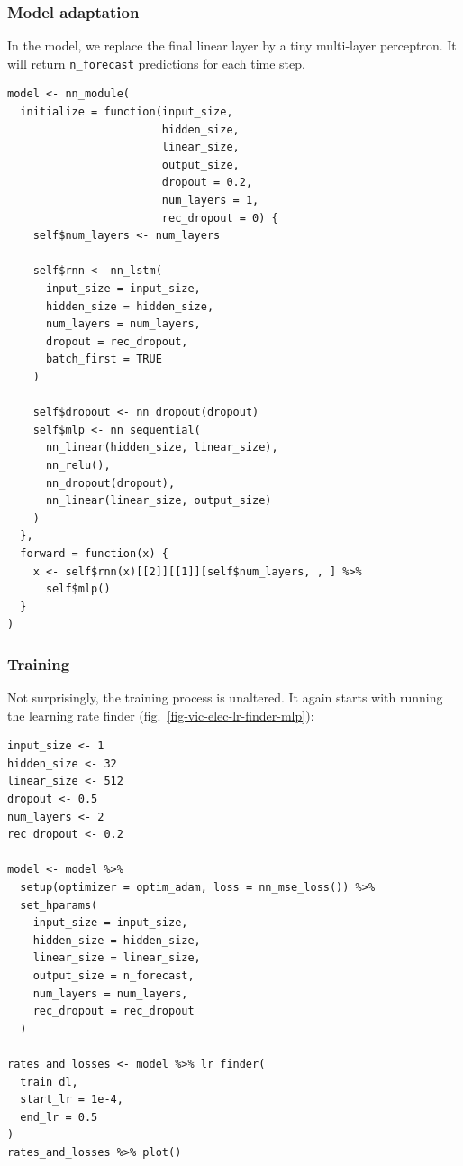 \documentclass[
  letterpaper,
]{krantz}
\begin{document}
\hypertarget{model-adaptation}{%
\subsubsection{Model adaptation}\label{model-adaptation}}

In the model, we replace the final linear layer by a tiny multi-layer
perceptron. It will return \texttt{n\_forecast} predictions for each
time step.

\begin{verbatim}
model <- nn_module(
  initialize = function(input_size,
                        hidden_size,
                        linear_size,
                        output_size,
                        dropout = 0.2,
                        num_layers = 1,
                        rec_dropout = 0) {
    self$num_layers <- num_layers

    self$rnn <- nn_lstm(
      input_size = input_size,
      hidden_size = hidden_size,
      num_layers = num_layers,
      dropout = rec_dropout,
      batch_first = TRUE
    )

    self$dropout <- nn_dropout(dropout)
    self$mlp <- nn_sequential(
      nn_linear(hidden_size, linear_size),
      nn_relu(),
      nn_dropout(dropout),
      nn_linear(linear_size, output_size)
    )
  },
  forward = function(x) {
    x <- self$rnn(x)[[2]][[1]][self$num_layers, , ] %>%
      self$mlp()
  }
)
\end{verbatim}

\hypertarget{training-3}{%
\subsubsection{Training}\label{training-3}}

Not surprisingly, the training process is unaltered. It again starts
with running the learning rate finder
(fig.~\ref{fig-vic-elec-lr-finder-mlp}):

\begin{verbatim}
input_size <- 1
hidden_size <- 32
linear_size <- 512
dropout <- 0.5
num_layers <- 2
rec_dropout <- 0.2

model <- model %>%
  setup(optimizer = optim_adam, loss = nn_mse_loss()) %>%
  set_hparams(
    input_size = input_size,
    hidden_size = hidden_size,
    linear_size = linear_size,
    output_size = n_forecast,
    num_layers = num_layers,
    rec_dropout = rec_dropout
  )

rates_and_losses <- model %>% lr_finder(
  train_dl,
  start_lr = 1e-4,
  end_lr = 0.5
)
rates_and_losses %>% plot()
\end{verbatim}
\end{document}
